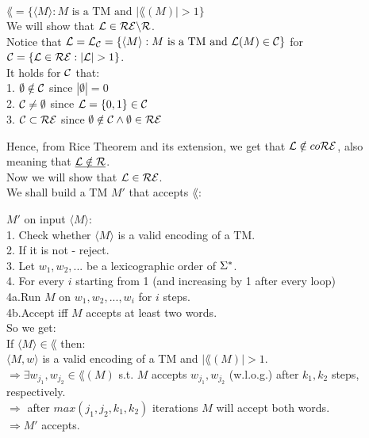 $\lang = \{\langle M \rangle : M \text{ is a TM and } |\lang(M)| > 1\}$ \\

We will show that $\mathcal{L} \in \mathcal{R}\mathcal{E} \backslash \mathcal{R}$. \\

Notice that $\mathcal{L} = \mathcal{L}_{\mathcal{C}} = \{\langle M \rangle : M \text{ is a TM and } \mathcal{L}(M) \in \mathcal{C}\}$ for $\mathcal{C} = \{\mathcal{L} \in \mathcal{R}\mathcal{E} : |\mathcal{L}| > 1\}$. \\
It holds for $\mathcal{C}$ that: \\
1. $\emptyset \notin \mathcal{C}$ since $|\emptyset| = 0$ \\
2. $\mathcal{C} \neq \emptyset$ since $\mathcal{L} = \{0, 1\} \in \mathcal{C}$ \\
3. $\mathcal{C} \subset \mathcal{R}\mathcal{E}$ since $\emptyset \notin \mathcal{C} \wedge \emptyset \in \mathcal{R}\mathcal{E}$

Hence, from Rice Theorem and its extension, we get that $\mathcal{L} \notin co\mathcal{R}\mathcal{E}$, also meaning that $\underline{\mathcal{L} \notin \mathcal{R}}$. \\

Now we will show that $\mathcal{L} \in \mathcal{R}\mathcal{E}$. \\
We shall build a TM $M'$ that accepts $\lang$:

$M'$ on input $\langle M \rangle$: \\
1. Check whether $\langle M \rangle$ is a valid encoding of a TM. \\
2. If it is not - reject. \\
3. Let $w_1, w_2, ...$ be a lexicographic order of $\Sigma^*$. \\
4. For every $i$ starting from 1 (and increasing by 1 after every loop) \\
4a.\qquad Run $M$ on $w _1, w_2, ..., w_i$ for $i$ steps. \\
4b.\qquad Accept iff $M$ accepts at least two words. \\

So we get: \\
If $\langle M \rangle \in \lang$ then: \\
$\langle M, w \rangle$ is a valid encoding of a TM and $|\lang(M)| > 1$. \\
$\Rightarrow \exists w_{j_1}, w_{j_2} \in \lang(M)$ s.t. $M$ accepts $w_{j_1}, w_{j_2}$ (w.l.o.g.) after $k_1, k_2$ steps, respectively. \\
$\Rightarrow$ after $max(j_1, j_2, k_1, k_2)$ iterations $M$ will accept both words. \\
$\Rightarrow M'$ accepts. \\

